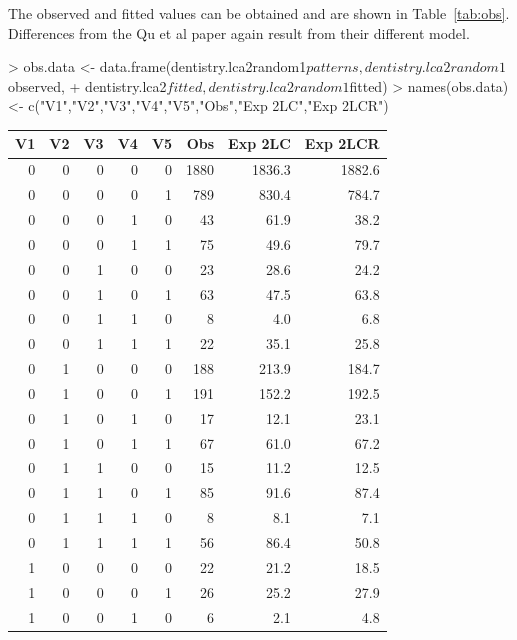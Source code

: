 The observed and fitted values can be obtained and are shown in Table~\ref{tab:obs}. Differences from the Qu et al paper again result from their different model.

\begin{Schunk}
\begin{Sinput}
> obs.data <- data.frame(dentistry.lca2random1$patterns,dentistry.lca2random1$observed,
+ 	dentistry.lca2$fitted,dentistry.lca2random1$fitted)
> names(obs.data) <- c("V1","V2","V3","V4","V5","Obs","Exp 2LC","Exp 2LCR")
\end{Sinput}
\end{Schunk}



\begin{table}[ht]
\centering
\begin{tabular}{rrrrrrrr}
  \hline
V1 & V2 & V3 & V4 & V5 & Obs & Exp 2LC & Exp 2LCR \\ 
  \hline
0 & 0 & 0 & 0 & 0 & 1880 & 1836.3 & 1882.6 \\ 
  0 & 0 & 0 & 0 & 1 & 789 & 830.4 & 784.7 \\ 
  0 & 0 & 0 & 1 & 0 & 43 & 61.9 & 38.2 \\ 
  0 & 0 & 0 & 1 & 1 & 75 & 49.6 & 79.7 \\ 
  0 & 0 & 1 & 0 & 0 & 23 & 28.6 & 24.2 \\ 
  0 & 0 & 1 & 0 & 1 & 63 & 47.5 & 63.8 \\ 
  0 & 0 & 1 & 1 & 0 & 8 & 4.0 & 6.8 \\ 
  0 & 0 & 1 & 1 & 1 & 22 & 35.1 & 25.8 \\ 
  0 & 1 & 0 & 0 & 0 & 188 & 213.9 & 184.7 \\ 
  0 & 1 & 0 & 0 & 1 & 191 & 152.2 & 192.5 \\ 
  0 & 1 & 0 & 1 & 0 & 17 & 12.1 & 23.1 \\ 
  0 & 1 & 0 & 1 & 1 & 67 & 61.0 & 67.2 \\ 
  0 & 1 & 1 & 0 & 0 & 15 & 11.2 & 12.5 \\ 
  0 & 1 & 1 & 0 & 1 & 85 & 91.6 & 87.4 \\ 
  0 & 1 & 1 & 1 & 0 & 8 & 8.1 & 7.1 \\ 
  0 & 1 & 1 & 1 & 1 & 56 & 86.4 & 50.8 \\ 
  1 & 0 & 0 & 0 & 0 & 22 & 21.2 & 18.5 \\ 
  1 & 0 & 0 & 0 & 1 & 26 & 25.2 & 27.9 \\ 
  1 & 0 & 0 & 1 & 0 & 6 & 2.1 & 4.8 \\ 

\end{tabular}
\end{table}
